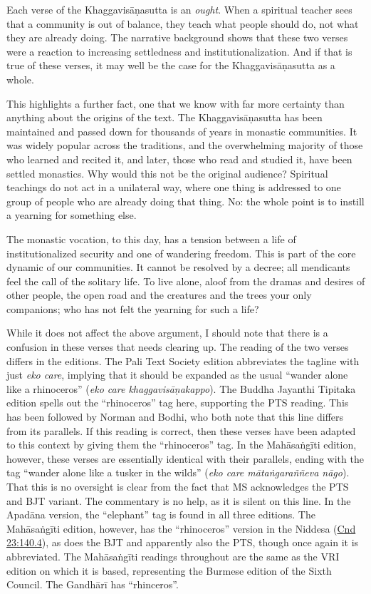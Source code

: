 \documentclass[12pt,openany]{book}%
\begin{document}
Each verse of the \textsanskrit{Khaggavisāṇasutta} is an \emph{ought}. When a spiritual teacher sees that a community is out of balance, they teach what people should do, not what they are already doing. The narrative background shows that these two verses were a reaction to increasing settledness and institutionalization. And if that is true of these verses, it may well be the case for the \textsanskrit{Khaggavisāṇasutta} as a whole.

This highlights a further fact, one that we know with far more certainty than anything about the origins of the text. The \textsanskrit{Khaggavisāṇasutta} has been maintained and passed down for thousands of years in monastic communities. It was widely popular across the traditions, and the overwhelming majority of those who learned and recited it, and later, those who read and studied it, have been settled monastics. Why would this not be the original audience? Spiritual teachings do not act in a unilateral way, where one thing is addressed to one group of people who are already doing that thing. No: the whole point is to instill a yearning for something else.

The monastic vocation, to this day, has a tension between a life of institutionalized security and one of wandering freedom. This is part of the core dynamic of our communities. It cannot be resolved by a decree; all mendicants feel the call of the solitary life. To live alone, aloof from the dramas and desires of other people, the open road and the creatures and the trees your only companions; who has not felt the yearning for such a life?

While it does not affect the above argument, I should note that there is a confusion in these verses that needs clearing up. The reading of the two verses differs in the editions. The Pali Text Society edition abbreviates the tagline with just \textit{eko care}, implying that it should be expanded as the usual “wander alone like a rhinoceros” (\textit{eko care \textsanskrit{khaggavisāṇakappo}}). The Buddha Jayanthi Tipitaka edition spells out the “rhinoceros” tag here, supporting the PTS reading. This has been followed by Norman and Bodhi, who both note that this line differs from its parallels. If this reading is correct, then these verses have been adapted to this context by giving them the “rhinoceros” tag. In the \textsanskrit{Mahāsaṅgīti} edition, however, these verses are essentially identical with their parallels, ending with the tag “wander alone like a tusker in the wilds” (\textit{eko care \textsanskrit{mātaṅgaraññeva} \textsanskrit{nāgo}}). That this is no oversight is clear from the fact that MS acknowledges the PTS and BJT variant. The commentary is no help, as it is silent on this line. In the \textsanskrit{Apadāna} version, the “elephant” tag is found in all three editions. The \textsanskrit{Mahāsaṅgīti} edition, however, has the “rhinoceros” version in the Niddesa (\href{https://suttacentral.net/cnd23}{Cnd 23:140.4}), as does the BJT and apparently also the PTS, though once again it is abbreviated. The \textsanskrit{Mahāsaṅgīti} readings throughout are the same as the VRI edition on which it is based, representing the Burmese edition of the Sixth Council. The \textsanskrit{Gandhārī} has “rhinceros”.
\end{document}
